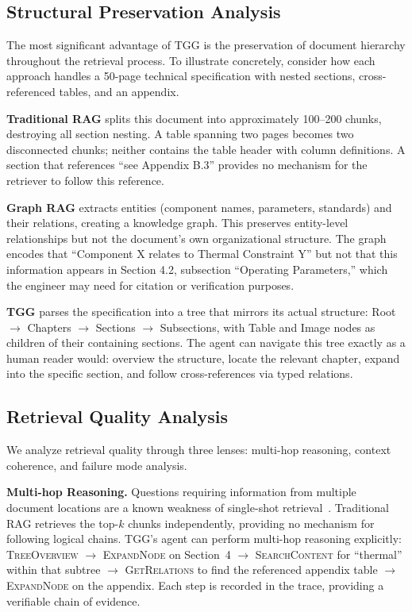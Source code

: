 \documentclass[conference]{IEEEtran}
\begin{document}
\subsection{Structural Preservation Analysis}

The most significant advantage of TGG is the preservation of document hierarchy throughout the retrieval process. To illustrate concretely, consider how each approach handles a 50-page technical specification with nested sections, cross-referenced tables, and an appendix.

\textbf{Traditional RAG} splits this document into approximately 100--200 chunks, destroying all section nesting. A table spanning two pages becomes two disconnected chunks; neither contains the table header with column definitions. A section that references ``see Appendix B.3'' provides no mechanism for the retriever to follow this reference.

\textbf{Graph RAG} extracts entities (component names, parameters, standards) and their relations, creating a knowledge graph. This preserves entity-level relationships but not the document's own organizational structure. The graph encodes that ``Component X relates to Thermal Constraint Y'' but not that this information appears in Section 4.2, subsection ``Operating Parameters,'' which the engineer may need for citation or verification purposes.

\textbf{TGG} parses the specification into a tree that mirrors its actual structure: Root $\rightarrow$ Chapters $\rightarrow$ Sections $\rightarrow$ Subsections, with Table and Image nodes as children of their containing sections. The agent can navigate this tree exactly as a human reader would: overview the structure, locate the relevant chapter, expand into the specific section, and follow cross-references via typed relations.

\subsection{Retrieval Quality Analysis}

We analyze retrieval quality through three lenses: multi-hop reasoning, context coherence, and failure mode analysis.

\textbf{Multi-hop Reasoning.} Questions requiring information from multiple document locations are a known weakness of single-shot retrieval~\cite{liu2024lostmiddle}. Traditional RAG retrieves the top-$k$ chunks independently, providing no mechanism for following logical chains. TGG's agent can perform multi-hop reasoning explicitly: \textsc{TreeOverview} $\rightarrow$ \textsc{ExpandNode} on Section~4 $\rightarrow$ \textsc{SearchContent} for ``thermal'' within that subtree $\rightarrow$ \textsc{GetRelations} to find the referenced appendix table $\rightarrow$ \textsc{ExpandNode} on the appendix. Each step is recorded in the trace, providing a verifiable chain of evidence.
\end{document}
